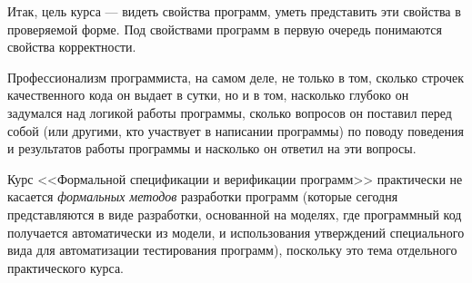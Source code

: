 Итак, цель курса --- видеть свойства программ, уметь представить эти свойства в проверяемой форме. Под свойствами программ в первую очередь понимаются свойства корректности. 

Профессионализм программиста, на самом деле, не только в том, сколько строчек качественного кода он выдает в сутки, но и в том, насколько глубоко он задумался над логикой работы программы, сколько вопросов он поставил перед собой (или другими, кто участвует в написании программы) по поводу поведения и результатов работы программы и насколько он ответил на эти вопросы.


Курс <<Формальной спецификации и верификации программ>> практически не касается \emph{формальных методов} разработки программ (которые сегодня представляются в виде разработки, основанной на моделях, где программный код получается автоматически из модели, и использования утверждений специального вида для автоматизации тестирования программ), поскольку это тема отдельного практического курса.

